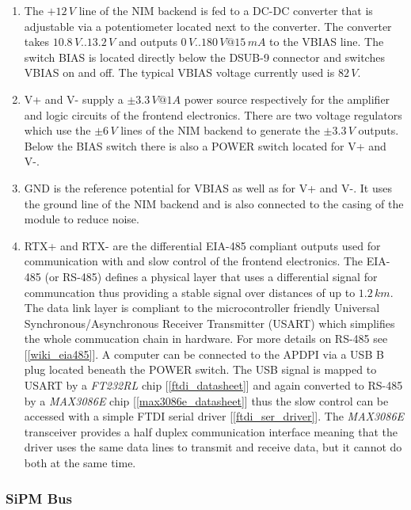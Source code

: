 	\begin{enumerate}

		\item The $+12\,V$ line of the NIM backend is fed to a DC-DC converter that is adjustable via a potentiometer located next to the converter.
		The converter takes $10.8\,V .. 13.2\,V$ and outputs $0\,V .. 180\,V@15\,mA$ to the VBIAS line. The switch BIAS is located directly below the DSUB-9 connector
		and switches VBIAS on and off. The typical VBIAS voltage currently used is $82\,V$.

		\item V+ and V- supply a $\pm3.3\,V@1A$ power source respectively for the amplifier and logic circuits of the frontend electronics. There are two voltage regulators 
		which use the $\pm6\,V$ lines of the NIM backend to generate the $\pm3.3\,V$ outputs. Below the BIAS switch there is also a POWER switch located for V+ and V-.

		\item GND is the reference potential for VBIAS as well as for V+ and V-. It uses the ground line of the NIM backend and is also connected to the casing of the module to reduce noise.

		\item RTX+ and RTX- are the differential EIA-485 compliant outputs used for communication with and slow control of the frontend electronics. The EIA-485 (or RS-485) defines a 
		physical layer that uses a differential signal for communcation thus providing a stable signal over distances of up to $1.2\,km$. The data link layer is 
		compliant to the microcontroller friendly Universal Synchronous/Asynchronous Receiver Transmitter (USART) which simplifies the whole commucation chain in hardware. 
		For more details on RS-485 see [\ref{wiki_eia485}].
		A computer can be connected to the APDPI via a USB B plug located beneath the POWER switch. The USB signal is mapped to USART by a \emph{FT232RL} chip [\ref{ftdi_datasheet}] 
		and again converted to RS-485 by a \emph{MAX3086E} chip [\ref{max3086e_datasheet}] thus the slow control can be accessed with a simple FTDI serial driver [\ref{ftdi_ser_driver}].
		The \emph{MAX3086E} transceiver provides a half duplex communication interface meaning that the driver uses the same data lines to transmit and receive data, but it cannot
		do both at the same time.
	
	\end{enumerate}

\subsubsection{SiPM Bus}

